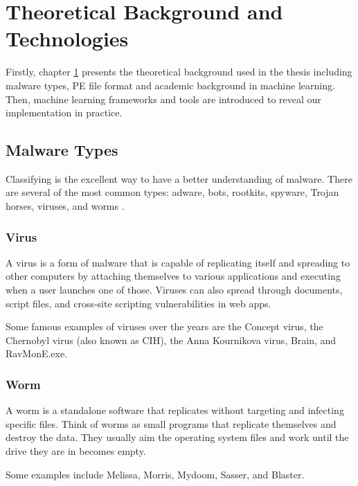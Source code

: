 \chapter{Theoretical Background and Technologies}
\label{chap:background}
\graphicspath{{Chapter3/Figs/}}

\begin{chapabstract}
Firstly, chapter \ref{chap:background} presents the theoretical background used in the thesis including malware types, PE file format and academic background in machine learning. Then, machine learning frameworks and tools are introduced to reveal our implementation in practice.
\end{chapabstract}

\section{Malware Types}
\label{sec:malware}

Classifying is the excellent way to have a better understanding of malware. There are several of the most common types: adware, bots, rootkits, spyware, Trojan horses, viruses, and worms \cite{neil2012common}.

\subsection{Virus}

A virus is a form of malware that is capable of replicating itself and spreading to other computers by attaching themselves to various applications and executing when a user launches one of those. Viruses can also spread through documents, script files, and cross-site scripting vulnerabilities in web apps.

Some famous examples of viruses over the years are the Concept virus, the Chernobyl virus (also known as CIH), the Anna Kournikova virus, Brain, and RavMonE.exe.

\subsection{Worm}

A worm is a standalone software that replicates without targeting and infecting specific files. Think of worms as small programs that replicate themselves and destroy the data. They usually aim the operating system files and work until the drive they are in becomes empty.

Some examples include Melissa, Morris, Mydoom, Sasser, and Blaster.


